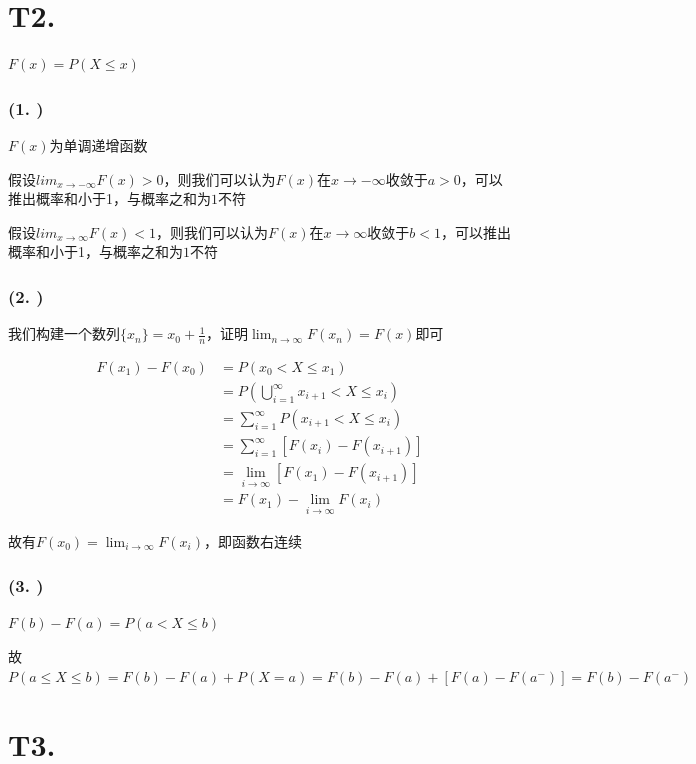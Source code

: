 \documentclass{article}
\newcommand\f[2]{\frac{#1}{#2}}
\begin{document}
\section*{T2. }

$F(x)=P(X\leq x)$

\subsubsection*{(1. )}

$F(x)$为单调递增函数

假设$lim_{x\to-\infty}F(x)>0$，则我们可以认为$F(x)$在$x\to-\infty$收敛于$a>0$，可以推出概率和小于1，与概率之和为$1$不符

假设$lim_{x\to\infty}F(x)<1$，则我们可以认为$F(x)$在$x\to\infty$收敛于$b<1$，可以推出概率和小于1，与概率之和为$1$不符

\subsubsection*{(2. )}

我们构建一个数列$\{x_n\}=x_0+\f{1}{n}$，证明$\lim_{n\to\infty}F(x_n)=F(x)$即可

\begin{equation}
    \begin{aligned}
        F(x_1)-F(x_0)
        & =P(x_0<X\leq x_1)\\
        & =P(\bigcup_{i=1}^\infty x_{i+1}<X\leq x_i)\\
        & =\sum_{i=1}^{\infty}P(x_{i+1}<X\leq x_i)\\
        & =\sum_{i=1}^{\infty}[F(x_i)-F(x_{i+1})]\\
        & =\lim_{i\to\infty}[F(x_1)-F(x_{i+1})]\\
        & =F(x_1)-\lim_{i\to\infty}F(x_i)
    \end{aligned}
\end{equation}

故有$F(x_0)=\lim_{i\to\infty}F(x_i)$，即函数右连续

\subsubsection*{(3. )}

$F(b)-F(a)=P(a< X\leq b)$

故$P(a\leq X\leq b)=F(b)-F(a)+P(X=a)=F(b)-F(a)+[F(a)-F(a^-)]=F(b)-F(a^-)$


\section*{T3. }
\end{document}
